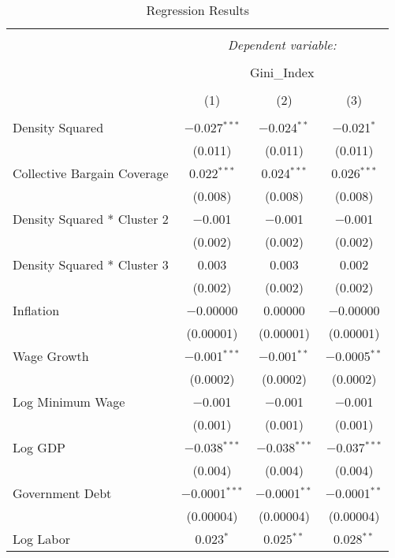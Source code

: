 
\begin{table}[!htbp] \centering 
  \caption{Regression Results} 
  \label{} 
\begin{tabular}{@{\extracolsep{5pt}}lccc} 
\\[-1.8ex]\hline 
\hline \\[-1.8ex] 
 & \multicolumn{3}{c}{\textit{Dependent variable:}} \\ 
\cline{2-4} 
\\[-1.8ex] & \multicolumn{3}{c}{Gini\_Index} \\ 
\\[-1.8ex] & (1) & (2) & (3)\\ 
\hline \\[-1.8ex] 
 Density Squared & $-$0.027$^{***}$ & $-$0.024$^{**}$ & $-$0.021$^{*}$ \\ 
  & (0.011) & (0.011) & (0.011) \\ 
  Collective Bargain Coverage & 0.022$^{***}$ & 0.024$^{***}$ & 0.026$^{***}$ \\ 
  & (0.008) & (0.008) & (0.008) \\ 
  Density Squared * Cluster 2 & $-$0.001 & $-$0.001 & $-$0.001 \\ 
  & (0.002) & (0.002) & (0.002) \\ 
  Density Squared * Cluster 3 & 0.003 & 0.003 & 0.002 \\ 
  & (0.002) & (0.002) & (0.002) \\ 
  Inflation & $-$0.00000 & 0.00000 & $-$0.00000 \\ 
  & (0.00001) & (0.00001) & (0.00001) \\ 
  Wage Growth & $-$0.001$^{***}$ & $-$0.001$^{**}$ & $-$0.0005$^{**}$ \\ 
  & (0.0002) & (0.0002) & (0.0002) \\ 
  Log Minimum Wage & $-$0.001 & $-$0.001 & $-$0.001 \\ 
  & (0.001) & (0.001) & (0.001) \\ 
  Log GDP & $-$0.038$^{***}$ & $-$0.038$^{***}$ & $-$0.037$^{***}$ \\ 
  & (0.004) & (0.004) & (0.004) \\ 
  Government Debt & $-$0.0001$^{***}$ & $-$0.0001$^{**}$ & $-$0.0001$^{**}$ \\ 
  & (0.00004) & (0.00004) & (0.00004) \\ 
  Log Labor & 0.023$^{*}$ & 0.025$^{**}$ & 0.028$^{**}$ \\ 

\end{tabular}
\end{table}
